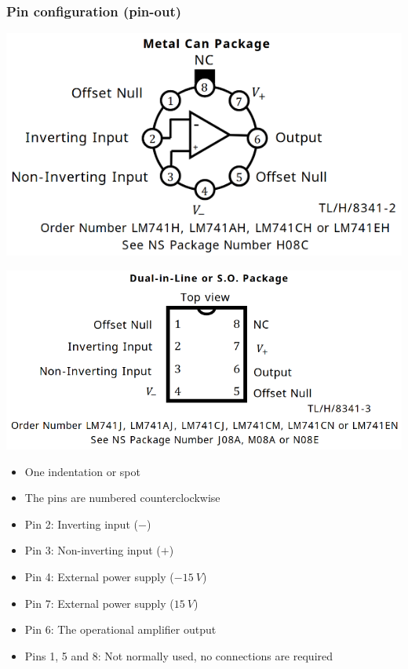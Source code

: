 \documentclass[11pt]{article}
\begin{document}
\subsubsection{Pin configuration (pin-out)}
\label{sec:orgacac4c3}
\begin{center}
\includegraphics[width=.9\linewidth]{./images/operational-amplifier-metal-can-package.png}
\end{center}
\begin{center}
\includegraphics[width=.9\linewidth]{./images/operational-amplifier-dual-inline-package.png}
\end{center}
\begin{itemize}
\item One indentation or spot
\item The pins are numbered counterclockwise
\item Pin 2: Inverting input (\(-\))
\item Pin 3: Non-inverting input (\(+\))
\item Pin 4: External power supply (\(\qty{-15}{V}\))
\item Pin 7: External power supply (\(\qty{+15}{V}\))
\item Pin 6: The operational amplifier output
\item Pins 1, 5 and 8: Not normally used, no connections are required
\end{itemize}
\end{document}
